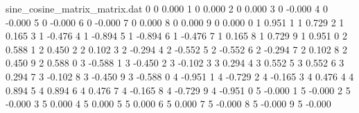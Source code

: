 
\begin{filecontents*}[overwrite]{sine_cosine_matrix_matrix.dat}
0 0 0.000
1 0 0.000
2 0 0.000
3 0 -0.000
4 0 -0.000
5 0 -0.000
6 0 -0.000
7 0 0.000
8 0 0.000
9 0 0.000
0 1 0.951
1 1 0.729
2 1 0.165
3 1 -0.476
4 1 -0.894
5 1 -0.894
6 1 -0.476
7 1 0.165
8 1 0.729
9 1 0.951
0 2 0.588
1 2 0.450
2 2 0.102
3 2 -0.294
4 2 -0.552
5 2 -0.552
6 2 -0.294
7 2 0.102
8 2 0.450
9 2 0.588
0 3 -0.588
1 3 -0.450
2 3 -0.102
3 3 0.294
4 3 0.552
5 3 0.552
6 3 0.294
7 3 -0.102
8 3 -0.450
9 3 -0.588
0 4 -0.951
1 4 -0.729
2 4 -0.165
3 4 0.476
4 4 0.894
5 4 0.894
6 4 0.476
7 4 -0.165
8 4 -0.729
9 4 -0.951
0 5 -0.000
1 5 -0.000
2 5 -0.000
3 5 0.000
4 5 0.000
5 5 0.000
6 5 0.000
7 5 -0.000
8 5 -0.000
9 5 -0.000
\end{filecontents*}

